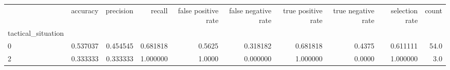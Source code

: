 \begin{tabular}{lrrrrrrrrr}
\toprule
{} &  accuracy &  precision &    recall &  false positive rate &  false negative rate &  true positive rate &  true negative rate &  selection rate &  count \\
tactical\_situation &           &            &           &                      &                      &                     &                     &                 &        \\
\midrule
0                  &  0.537037 &   0.454545 &  0.681818 &               0.5625 &             0.318182 &            0.681818 &              0.4375 &        0.611111 &   54.0 \\
2                  &  0.333333 &   0.333333 &  1.000000 &               1.0000 &             0.000000 &            1.000000 &              0.0000 &        1.000000 &    3.0 \\
\bottomrule
\end{tabular}
